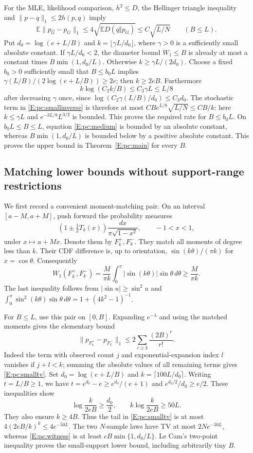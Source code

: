 \documentclass[11pt,a4paper]{article}
\theoremstyle{definition}
\theoremstyle{remark}
\numberwithin{equation}{section}
\begin{document}
For the MLE, likelihood comparison, $h^2\le D$, the Hellinger
triangle inequality and $\|p-q\|_1\le2h(p,q)$ imply
\[
 \mathbb E\|p_{\widehat G}-p_G\|_1
              \le4\sqrt{\mathbb E D(q\Vert p_G)}
              \le C\sqrt{L/N}\qquad(B\le L).
\]
Put $d_0=\log(e+L/B)$ and $k=\lfloor\gamma L/d_0\rfloor$,
where $\gamma>0$ is a sufficiently small absolute constant.
If $\gamma L/d_0<2$, the diameter bound $W_1\le B$ is already at
most a constant times $B\min(1,d_0/L)$.  Otherwise
$k\ge\gamma L/(2d_0)$.  Choose a fixed $b_0>0$ sufficiently small
that $B\le b_0L$ implies
$\gamma(L/B)/(2\log(e+L/B))\ge2e$; then $k\ge2eB$.
Furthermore
\[
 k\log(C_2k/B)\le C_3\gamma L\le L/8
\]
after decreasing $\gamma$ once, since
$\log(C_2\gamma(L/B)/d_0)\le C_3d_0$.
The stochastic term in \eqref{E:pc:smallinverse} is therefore at most
$CB e^{L/8}\sqrt{L/N}\le CB/k$: here $k\le\gamma L$ and
$e^{-3L/8}L^{3/2}$ is bounded.  This proves the required rate for
$B\le b_0L$.  On $b_0L\le B\le L$, equation \eqref{E:pc:medium}
is bounded by an absolute constant, whereas
$B\min(1,d_0/L)$ is bounded below by a positive absolute constant.
This proves the upper bound in Theorem~\ref{E:pc:main} for every $B$.

\subsection{Matching lower bounds without support-range restrictions}

We first record a convenient moment-matching pair.  On an interval
$[a-M,a+M]$, push forward the probability measures
\[
 (1\pm\tfrac12T_k(x))\frac{dx}{\pi\sqrt{1-x^2}},\qquad -1<x<1,
\]
under $x\mapsto a+Mx$.  Denote them by $F_k^+,F_k^-$.
They match all moments of degree less than $k$.  Their CDF difference
is, up to orientation, $\sin(k\theta)/(\pi k)$ for $x=\cos\theta$.
Consequently
\begin{equation}\label{E:pc:witness}
 W_1(F_k^+,F_k^-)
   =\frac M{\pi k}\int_0^\pi|\sin(k\theta)|\sin\theta\,d\theta
   \ge\frac M{\pi k}.
\end{equation}
The last inequality follows from $|\sin u|\ge\sin^2u$ and
$\int_0^\pi\sin^2(k\theta)\sin\theta\,d\theta
=1+(4k^2-1)^{-1}$.

For $B\le L$, use this pair on $[0,B]$.  Expanding $e^{-\lambda}$
and using the matched moments gives the elementary bound
\begin{equation}\label{E:pc:smalltv}
 \|p_{F_k^+}-p_{F_k^-}\|_1
 \le2\sum_{r\ge k}\frac{(2B)^r}{r!}.
\end{equation}
Indeed the term with observed count $j$ and exponential-expansion
index $l$ vanishes if $j+l<k$; summing the absolute values of all
remaining terms gives \eqref{E:pc:smalltv}.
Set $d_0=\log(e+L/B)$ and $k=\lceil100L/d_0\rceil$.
Writing $t=L/B\ge1$, we have
$t=e^{d_0}-e\ge e^{d_0}/(e+1)$ and
$e^{d_0/2}/d_0\ge e/2$.  These inequalities show
\[
 \log\frac{k}{2eB}\ge\frac{d_0}2,
 \qquad k\log\frac{k}{2eB}\ge50L.
\]
They also ensure $k\ge4B$.  Thus the tail in
\eqref{E:pc:smalltv} is at most $4(2eB/k)^k\le4e^{-50L}$.
The two $N$-sample laws have TV at most $2Ne^{-50L}$, whereas
\eqref{E:pc:witness} is at least
$cB\min\{1,d_0/L\}$.  Le Cam's two-point inequality proves the
small-support lower bound, including arbitrarily tiny $B$.
\end{document}
